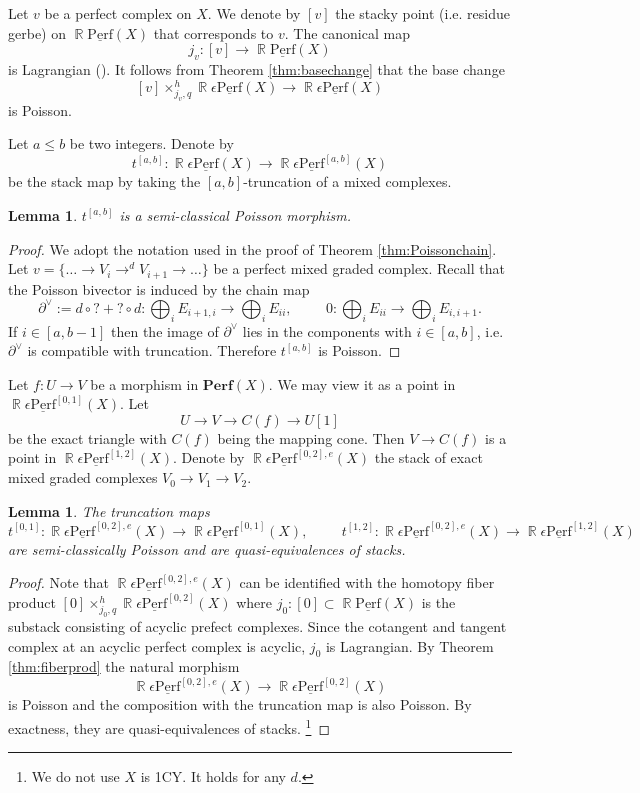\documentclass[reqno]{amsart}
\DeclareMathOperator\R{\mathbb R}
\newtheorem{lemma}[theorem]{Lemma}
\theoremstyle{definition}
\theoremstyle{remark}
\newcommand{\ul}{\underline}
\newcommand{\eps}{\epsilon}
\newcommand{\perf}{\mathbf{Perf}}
\newcommand{\uperf}{\ul{\mathrm{Perf}}}
\numberwithin{equation}{section}
\begin{document}

Let $v$ be a perfect complex on $X$. We denote by $[v]$ the stacky point (i.e. residue gerbe) on $\R\uperf(X)$ that corresponds to $v$. The canonical map 
\[
j_v: [v]\to \R\uperf(X)
\] is Lagrangian (\cite[Theorem 3.18]{HP1}). It follows from Theorem \ref{thm:basechange} that the base change
\[
[v]\times^h_{j_v, q} \R\eps\uperf(X)\to \R\eps\uperf(X)
\] is Poisson.

Let $a\leq b$ be two integers.
Denote by
\[
t^{[a,b]}: \R\eps\uperf(X)\to \R\eps\uperf^{[a,b]}(X)
\] be the stack map by taking the $[a,b]$-truncation of a mixed complexes. 

\begin{lemma}
$t^{[a,b]}$ is a semi-classical Poisson morphism.
\end{lemma}
\begin{proof}
We adopt the notation used in the proof of Theorem \ref{thm:Poissonchain}.
Let $v=\{\ldots\to V_i\to^d V_{i+1}\to \ldots\}$ be a perfect mixed graded complex. Recall that the Poisson bivector is induced by the chain map 
\[
\partial^\vee:=d\circ ?+ ?\circ d: \bigoplus_{i} E_{i+1,i}\to  \bigoplus_{i} E_{ii}, \hspace{1cm} 0: \bigoplus_{i} E_{ii}\to \bigoplus_{i} E_{i,i+1}.
\]
If $i\in [a,b-1]$ then the image of $\partial^\vee$ lies in the components with $i\in [a,b]$, i.e. $\partial^\vee$ is compatible with truncation. Therefore $t^{[a,b]}$ is Poisson.
\end{proof}

Let $f: U\to V$ be a morphism in $\perf(X)$. We may view it as a point in $\R\eps\uperf^{[0,1]}(X)$. Let 
\[
U\to V\to C(f)\to U[1]
\]  be the exact triangle with $C(f)$ being the mapping cone. Then $V\to C(f)$ is a point in $\R\eps\uperf^{[1,2]}(X)$. Denote by $\R\eps\uperf^{[0,2],e}(X)$ the stack of exact mixed graded complexes $V_0\to V_1\to V_2$.
\begin{lemma}\label{lem:exacttriangle}
The truncation maps
\[
t^{[0,1]}: \R\eps\uperf^{[0,2],e}(X)\to \R\eps\uperf^{[0,1]}(X), \hspace{1cm}  t^{[1,2]}: \R\eps\uperf^{[0,2],e}(X)\to \R\eps\uperf^{[1,2]}(X)
\] are semi-classically Poisson and are  quasi-equivalences of stacks.
\end{lemma}
\begin{proof}
Note that $\R\eps\uperf^{[0,2],e}(X)$ can be identified with the homotopy fiber product $[0]\times^h_{j_0, q} \R\eps\uperf^{[0,2]}(X)$ where $j_0: [0]\subset \R\uperf(X)$ is the substack consisting of acyclic prefect complexes. Since the cotangent and tangent complex at an acyclic perfect complex is acyclic, $j_0$ is Lagrangian. By Theorem \ref{thm:fiberprod} the natural morphism
\[
\R\eps\uperf^{[0,2],e}(X)\to \R\eps\uperf^{[0,2]}(X)
\] is Poisson and the composition with the truncation map is also Poisson. By exactness, they are quasi-equivalences of stacks. \footnote{We do not use $X$ is 1CY. It holds for any $d$.}
\end{proof}
\end{document}
